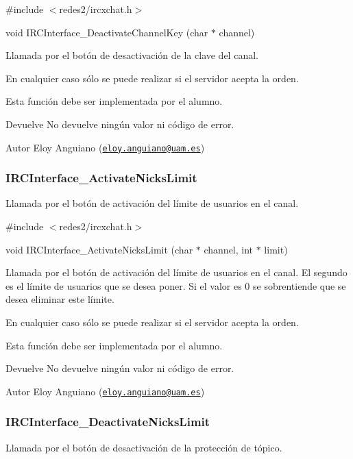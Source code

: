 \#include $<$redes2/ircxchat.\-h$>$

void I\-R\-C\-Interface\-\_\-\-Deactivate\-Channel\-Key (char $\ast$ channel)

Llamada por el botón de desactivación de la clave del canal.

En cualquier caso sólo se puede realizar si el servidor acepta la orden.

Esta función debe ser implementada por el alumno.

\begin{DoxyReturn}{Devuelve}
No devuelve ningún valor ni código de error.
\end{DoxyReturn}
\begin{DoxyAuthor}{Autor}
Eloy Anguiano (\href{mailto:eloy.anguiano@uam.es}{\tt eloy.\-anguiano@uam.\-es})
\end{DoxyAuthor}


 \hypertarget{IRCInterface_ActivateNicksLimit}{}\subsubsection{I\-R\-C\-Interface\-\_\-\-Activate\-Nicks\-Limit}\label{IRCInterface_ActivateNicksLimit}
Llamada por el botón de activación del límite de usuarios en el canal.

\#include $<$redes2/ircxchat.\-h$>$

void I\-R\-C\-Interface\-\_\-\-Activate\-Nicks\-Limit (char $\ast$ channel, int $\ast$ limit)

Llamada por el botón de activación del límite de usuarios en el canal. El segundo es el límite de usuarios que se desea poner. Si el valor es 0 se sobrentiende que se desea eliminar este límite.

En cualquier caso sólo se puede realizar si el servidor acepta la orden.

Esta función debe ser implementada por el alumno.

\begin{DoxyReturn}{Devuelve}
No devuelve ningún valor ni código de error.
\end{DoxyReturn}
\begin{DoxyAuthor}{Autor}
Eloy Anguiano (\href{mailto:eloy.anguiano@uam.es}{\tt eloy.\-anguiano@uam.\-es})
\end{DoxyAuthor}


 \hypertarget{IRCInterface_DeactivateNicksLimit}{}\subsubsection{I\-R\-C\-Interface\-\_\-\-Deactivate\-Nicks\-Limit}\label{IRCInterface_DeactivateNicksLimit}
Llamada por el botón de desactivación de la protección de tópico.

